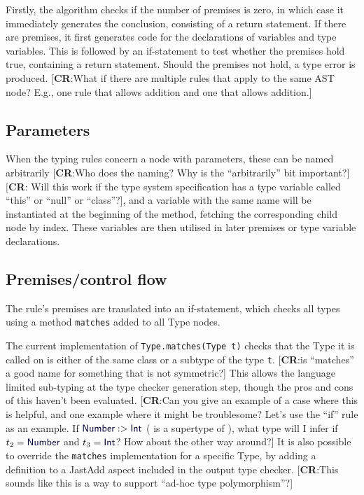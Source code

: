 \documentclass[nofilelist]{cslthse-msc}
\newcommand{\CR}[1]{\textcolor{green!60!black}{[\textbf{CR}:#1]}}
\begin{document}
Firstly, the algorithm checks if the number of premises is zero, in which case it immediately generates the conclusion, consisting of a return statement.
If there are premises, it first generates code for the declarations of variables and type variables.
This is followed by an if-statement to test whether the premises hold true, containing a return statement.
Should the premises not hold, a type error is produced.
\CR{What if there are multiple rules that apply to the same AST node?  E.g., one rule that allows \ty{Int} addition and one that allows \ty{String} addition.}

\subsection{Parameters}
When the typing rules concern a node with parameters, these can be named arbitrarily \CR{Who does the naming?  Why is the ``arbitrarily'' bit important?}\CR{ Will this work if the type system specification has a type variable called ``this'' or ``null'' or ``class''?}, and a variable with the same name will be instantiated at the beginning of the method, fetching the corresponding child node by index.
These variables are then utilised in later premises or type variable declarations.

\subsection{Premises/control flow}
The rule's premises are translated into an if-statement, which checks all types using a method \verb|matches| added to all Type nodes.

The current implementation of \verb|Type.matches(Type t)| checks that the Type it is called on is either of the same class or a subtype of the type \verb|t|.
\CR{is ``matches'' a good name for something that is not symmetric?}
This allows the language limited sub-typing at the type checker generation step, though the pros and cons of this haven't been evaluated.
\CR{Can you give an example of a case where this is helpful, and one example where it might be troublesome?
Let's use the ``if'' rule as an example.  If $\ty{Number} :> \ty{Int}$ (\ty{Number} is a supertype of \ty{Int}), what type will I infer if $t_2 = \ty{Number}$ and $t_3 = \ty{Int}$?  How about the other way around?}
It is also possible to override the \verb|matches| implementation for a specific Type, by adding a definition to a JastAdd aspect included in the output type checker.
\CR{This sounds like this is a way to support ``ad-hoc type polymorphism''?}
\end{document}
